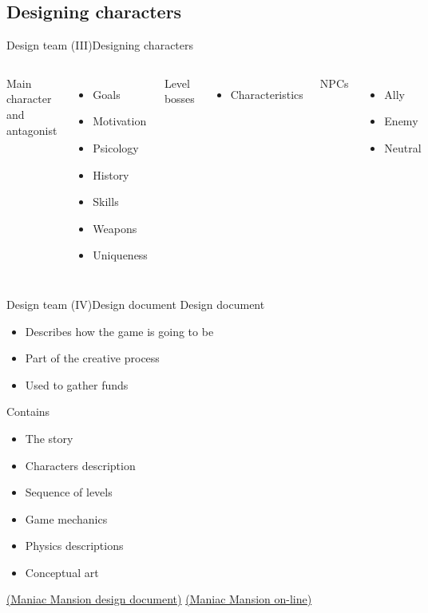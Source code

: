 \documentclass[10pt,compress]{beamer} %
\begin{document}
\subsection{Designing characters}
\begin{frame}{Design team (III)}{Designing characters}
    \begin{columns}
   Main character and antagonist
   \begin{itemize}
       \item Goals
       \item Motivation
       \item Psicology
       \item History
       \item Skills
       \item Weapons
       \item Uniqueness
   \end{itemize}

   Level bosses
   \begin{itemize}
        \item Characteristics
   \end{itemize}

   NPCs
   \begin{itemize}
        \item Ally
        \item Enemy
        \item Neutral
   \end{itemize}
    \end{columns}
\end{frame}

\begin{frame}{Design team (IV)}{Design document}
	Design document
	\begin{itemize}
		\item Describes how the game is going to be
		\item Part of the creative process
		\item Used to gather funds
	\end{itemize}
	Contains
	\begin{itemize}
		\item The story
		\item Characters description
		\item Sequence of levels
		\item Game mechanics 
		\item Physics descriptions
		\item Conceptual art
	\end{itemize}
	\href{http://grumpygamer.com/maniac_mansion_design_doc}{(Maniac Mansion design document)} \href{http://playdosgamesonline.com/maniac-mansion.html}{(Maniac Mansion on-line)}
\end{frame}
\end{document}
